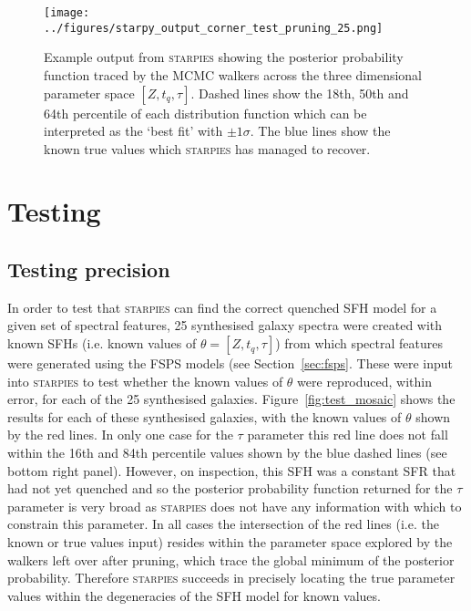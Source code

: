 \documentclass[useAMS,usenatbib]{mn2e}
\begin{document}
\begin{figure*}
\centering
\texttt{[image: ../figures/starpy\_output\_corner\_test\_pruning\_25.png]}
\caption{Example output from \textsc{starpies} showing the posterior probability function traced by the MCMC walkers across the three dimensional parameter space $[Z, t_q, \tau]$. Dashed lines show the 18th, 50th and 64th percentile of each distribution function which can be interpreted as the `best fit' with $±1\sigma$. The blue lines show the known true values which \textsc{starpies} has managed to recover.}
\label{fig:output}
\end{figure*}


\section{Testing}\label{sec:test}

\subsection{Testing precision}

In order to test that \textsc{starpies} can find the correct quenched SFH model for a given set of spectral features, 25 synthesised galaxy spectra were created with known SFHs (i.e. known values of $\theta = [Z, t_q, \tau]$) from which spectral features were generated using the FSPS models (see Section~\ref{sec:fsps}. These were input into \textsc{starpies} to test whether the known values of $\theta$ were reproduced, within error, for each of the 25 synthesised galaxies. Figure~\ref{fig:test_mosaic} shows the results for each of these synthesised galaxies, with the known values of $\theta$ shown by the red lines. In only one case for the $\tau$ parameter this red line does not fall within the 16th and 84th percentile values shown by the blue dashed lines (see bottom right panel). However, on inspection, this SFH was a constant SFR that had not yet quenched and so the posterior probability function returned for the $\tau$ parameter is very broad as \textsc{starpies} does not have any information with which to constrain this parameter. In all cases the intersection of the red lines (i.e. the known or true values input) resides within the parameter space explored by the walkers left over after pruning, which trace the global minimum of the posterior probability. Therefore \textsc{starpies} succeeds in precisely locating the true parameter values within the degeneracies of the SFH model for known values. 
\end{document}
